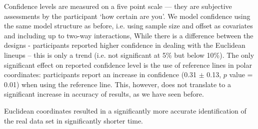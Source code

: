  Confidence levels are measured on a five point scale --- they are subjective assessments by the participant `how certain are you'. We model confidence using the same model structure as before, i.e. using sample size and offset as covariates and including up to two-way interactions,
While there is a difference between the designs - participants reported higher confidence in dealing with the Euclidean lineups -- this is only  a trend (i.e. not significant at 5\% but below 10\%). The only significant effect on reported confidence level is the use of reference lines in polar coordinates: participants report an increase in confidence (0.31 $\pm$ 0.13, $p$ value = 0.01) when using the reference line. This, however, does not translate to a significant increase in accuracy of results, as we have seen before.

 Euclidean coordinates resulted in a significantly more accurate identification of the real data set in significantly shorter time.






